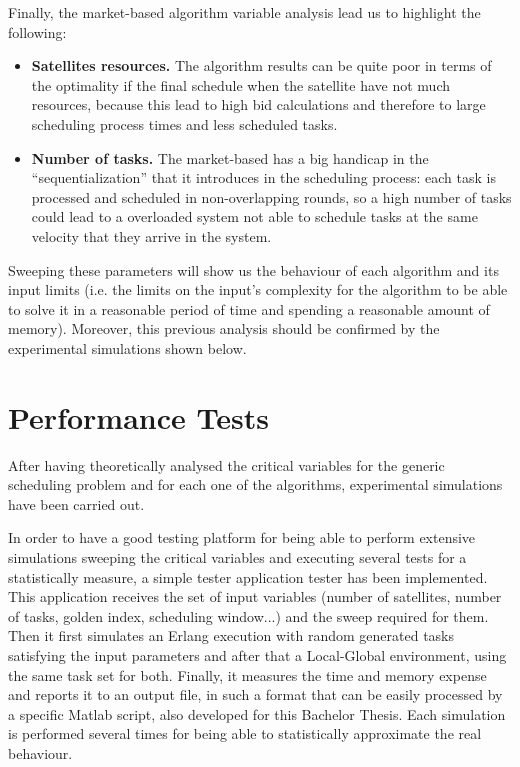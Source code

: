 Finally, the market-based algorithm variable analysis lead us to highlight the following:

\begin{itemize}
\item \textbf{Satellites resources. } The algorithm results can be quite poor in terms of the optimality if the final schedule when the satellite have not much resources, because this lead to high bid calculations and therefore to large scheduling process times and less scheduled tasks.

\item \textbf{Number of tasks. } The market-based has a big handicap in the ``sequentialization'' that it introduces in the scheduling process: each task is processed and scheduled in non-overlapping rounds, so a high number of tasks could lead to a overloaded system not able to schedule tasks at the same velocity that they arrive in the system.
\end{itemize}

Sweeping these parameters will show us the behaviour of each algorithm and its input limits (i.e. the limits on the input's complexity for the algorithm to be able to solve it in a reasonable period of time and spending a reasonable amount of memory). Moreover, this previous analysis should be confirmed by the experimental simulations shown below.

\section{Performance Tests}

After having theoretically analysed the critical variables for the generic scheduling problem and for each one of the algorithms, experimental simulations have been carried out.

In order to have a good testing platform for being able to perform extensive simulations sweeping the critical variables and executing several tests for a statistically measure, a simple tester application tester has been implemented. This application receives the set of input variables (number of satellites, number of tasks, golden index, scheduling window...) and the sweep required for them. Then it first simulates an Erlang execution with random generated tasks satisfying the input parameters and after that a Local-Global environment, using the same task set for both. Finally, it measures the time and memory expense and reports it to an output file, in such a format that can be easily processed by a specific Matlab script, also developed for this Bachelor Thesis. Each simulation is performed several times for being able to statistically approximate the real behaviour.

